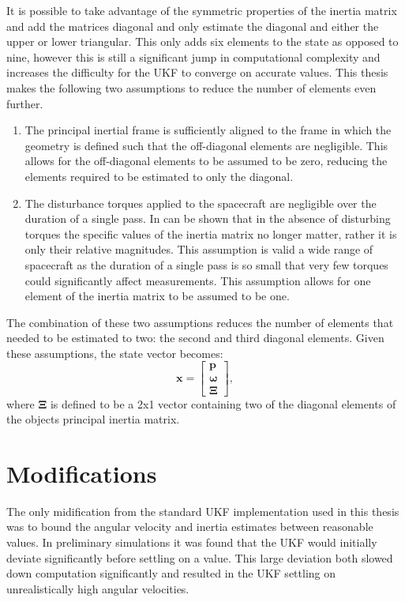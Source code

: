 It is possible to take advantage of the symmetric properties of the inertia matrix and add the matrices diagonal and only estimate the diagonal and either the upper or lower triangular. This only adds six elements to the state as opposed to nine, however this is still a significant jump in computational complexity and increases the difficulty for the UKF to converge on accurate values. This thesis makes the following two assumptions to reduce the number of elements even further.
\begin{enumerate}
\item The principal inertial frame is sufficiently aligned to the frame in which the geometry is defined such that the off-diagonal elements are negligible. This allows for the off-diagonal elements to be assumed to be zero, reducing the elements required to be estimated to only the diagonal.

\item The disturbance torques applied to the spacecraft are negligible over the duration of a single pass. In can be shown that in the absence of disturbing torques the specific values of the inertia matrix no longer matter, rather it is only their relative magnitudes. This assumption is valid a wide range of spacecraft as the duration of a single pass is so small that very few torques could significantly affect measurements. This assumption allows for one element of the inertia matrix to be assumed to be one.
\end{enumerate}
The combination of these two assumptions reduces the number of elements that needed to be estimated to two: the second and third diagonal elements. Given these assumptions, the state vector becomes:
\begin{equation}
\bm{x} = \begin{bmatrix} \bm{p} \\ \bm{\omega} \\ \bm{\Xi} \end{bmatrix},
\end{equation}
where $\bm{\Xi}$ is defined to be a 2x1 vector containing two of the diagonal elements of the objects principal inertia matrix.

\section{Modifications}

The only midification from the standard UKF implementation used in this thesis was to bound the angular velocity and inertia estimates between reasonable values. In preliminary simulations it was found that the UKF would initially deviate significantly before settling on a value. This large deviation both slowed down computation significantly and resulted in the UKF settling on unrealistically high angular velocities.

